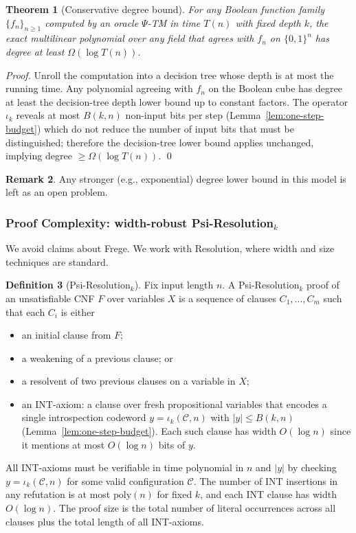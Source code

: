 \documentclass[11pt]{article}
\newtheorem{theorem}{Theorem}[section]
\theoremstyle{definition}
\newtheorem{definition}[theorem]{Definition}
\newtheorem{remark}[theorem]{Remark}
\newcommand{\PSi}{\Psi}
\newcommand{\bits}{\{0,1\}}
\begin{document}
\begin{theorem}[Conservative degree bound]
For any Boolean function family $\{f_n\}_{n\ge1}$ computed by an oracle $\PSi$-TM in time $T(n)$ with fixed depth $k$, the exact multilinear polynomial over any field that agrees with $f_n$ on $\bits^n$ has degree at least $\Omega(\log T(n))$.
\end{theorem}
\begin{proof}
Unroll the computation into a decision tree whose depth is at most the running time. Any polynomial agreeing with $f_n$ on the Boolean cube has degree at least the decision-tree depth lower bound up to constant factors. The operator $\iota_k$ reveals at most $B(k,n)$ non-input bits per step (Lemma~\ref{lem:one-step-budget}) which do not reduce the number of input bits that must be distinguished; therefore the decision-tree lower bound applies unchanged, implying degree $\ge \Omega(\log T(n))$. \qed
\end{proof}

\begin{remark}
Any stronger (e.g., exponential) degree lower bound in this model is left as an open problem.
\end{remark}

\subsubsection{Proof Complexity: width-robust Psi-Resolution$_k$}
\label{sec:proof-complexity}

We avoid claims about Frege. We work with Resolution, where width and size techniques are standard.

\begin{definition}[Psi-Resolution$_k$]
Fix input length $n$. A Psi-Resolution$_k$ proof of an unsatisfiable CNF $F$ over variables $X$ is a sequence of clauses $C_1,\ldots,C_m$ such that each $C_i$ is either
\begin{itemize}
  \item an initial clause from $F$;
  \item a weakening of a previous clause; or
  \item a resolvent of two previous clauses on a variable in $X$;
  \item an INT-axiom: a clause over fresh propositional variables that encodes a single introspection codeword $y=\iota_k(\mathcal{C},n)$ with $|y|\le B(k,n)$ (Lemma~\ref{lem:one-step-budget}). Each such clause has width $O(\log n)$ since it mentions at most $O(\log n)$ bits of $y$.
\end{itemize}
All INT-axioms must be verifiable in time polynomial in $n$ and $|y|$ by checking $y=\iota_k(\mathcal{C},n)$ for some valid configuration $\mathcal{C}$. The number of INT insertions in any refutation is at most $\mathrm{poly}(n)$ for fixed $k$, and each INT clause has width $O(\log n)$. The proof size is the total number of literal occurrences across all clauses plus the total length of all INT-axioms.
\end{definition}
\end{document}
